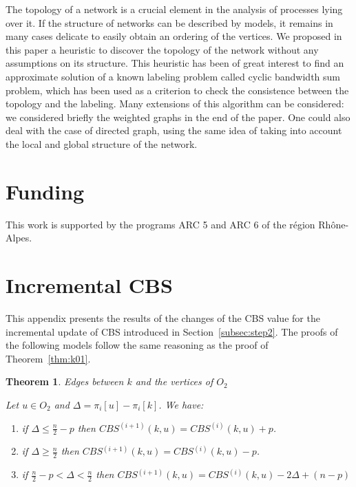\documentclass{scrartcl}
\theoremstyle{plain}
\newtheorem{theorem}{Theorem}[section]
\newcommand{\cbs}{CBS}
\begin{document}
The topology of a network is a crucial element in the analysis of processes 
lying over it. If the structure of networks can be described by models, 
it remains in many cases delicate to easily obtain an ordering of the vertices. 
We proposed in this paper a heuristic to discover the topology of the network 
without any assumptions on its structure. This heuristic has been of great 
interest to find an approximate solution of a known labeling problem called 
cyclic bandwidth sum problem, which has been used as a criterion to check the 
consistence between the topology and the labeling. Many extensions of 
this algorithm can be considered: we considered briefly the weighted graphs in 
the end of the paper. One could also deal with the case of directed graph, 
using the same idea of taking into account the local and global structure of 
the network. 


\section*{Funding}

This work is supported by the programs ARC 5 and ARC 6 of the r\'egion 
Rh\^one-Alpes. 


\clearpage

\makeatletter{}\appendix


\section{Incremental \cbs}
\label{apdx:theorems}

This appendix presents the results of the changes of the \cbs{} value for the 
incremental update of \cbs{} introduced in Section~\ref{subsec:step2}. The 
proofs of the following models follow the same reasoning as the proof of 
Theorem~\ref{thm:k01}.


\begin{theorem}{Edges between $k$ and the vertices of $O_2$}

Let $u \in O_2$ and $\Delta = \pi_i[u] - \pi_i[k]$. We have:
\begin{enumerate}
\item if $\Delta \leq \frac{n}{2} - p$ then
  $\cbs{}^{(i+1)}(k,u)=\cbs{}^{(i)}(k,u)+p$.
\item if $\Delta \geq \frac{n}{2} $ then
  $\cbs{}^{(i+1)}(k,u)=\cbs{}^{(i)}(k,u)-p$.
\item  if $\frac{n}{2} -p < \Delta < \frac{n}{2} $ then
$\cbs{}^{(i+1)}(k,u)=\cbs{}^{(i)}(k,u)-2\Delta + (n-p)$
\end{enumerate}
\end{theorem}
\end{document}
